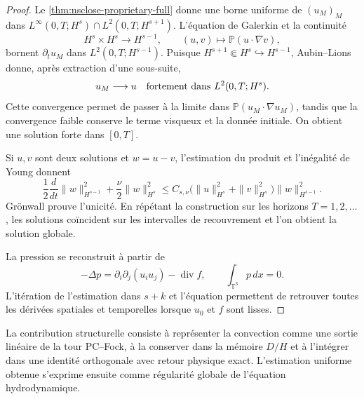 \begin{proof}
Le \cref{thm:nsclose-proprietary-full} donne une borne uniforme de \((u_M)_M\) dans \(L^\infty(0,T;H^s)\cap L^2(0,T;H^{s+1})\). L'équation de Galerkin et la continuité
\[
 H^s\times H^s\longrightarrow H^{s-1},
 \qquad (u,v)\longmapsto\mathbb P(u\cdot\nabla v),
\]
bornent \(\partial_tu_M\) dans \(L^2(0,T;H^{s-1})\). Puisque \(H^{s+1}\Subset H^s\hookrightarrow H^{s-1}\), Aubin--Lions donne, après extraction d'une sous-suite,
\[
 u_M\longrightarrow u\quad\hbox{fortement dans }L^2(0,T;H^s).
\]
Cette convergence permet de passer à la limite dans \(\mathbb P(u_M\cdot\nabla u_M)\), tandis que la convergence faible conserve le terme visqueux et la donnée initiale. On obtient une solution forte dans \([0,T]\).

Si \(u,v\) sont deux solutions et \(w=u-v\), l'estimation du produit et l'inégalité de Young donnent
\[
 \frac12\frac d{dt}\|w\|_{H^{s-1}}^2
 +\frac\nu2\|w\|_{H^s}^2
 \le C_{s,\nu}\bigl(\|u\|_{H^s}^2+\|v\|_{H^s}^2\bigr)
 \|w\|_{H^{s-1}}^2.
\]
Grönwall prouve l'unicité. En répétant la construction sur les horizons \(T=1,2,\ldots\), les solutions coïncident sur les intervalles de recouvrement et l'on obtient la solution globale.

La pression se reconstruit à partir de
\begin{equation}
 -\Delta p=\partial_i\partial_j(u_i u_j)-\operatorname{div}f,
 \qquad \int_{\mathbb T^3}p\,dx=0.
 \label{eq:nsclose-pressure-recovery}
\end{equation}
L'itération de l'estimation dans \(s+k\) et l'équation permettent de retrouver toutes les dérivées spatiales et temporelles lorsque \(u_0\) et \(f\) sont lisses.
\end{proof}

La contribution structurelle consiste à représenter la convection comme une sortie linéaire de la tour PC--Fock, à la conserver dans la mémoire \(D/H\) et à l'intégrer dans une identité orthogonale avec retour physique exact. L'estimation uniforme obtenue s'exprime ensuite comme régularité globale de l'équation hydrodynamique.
